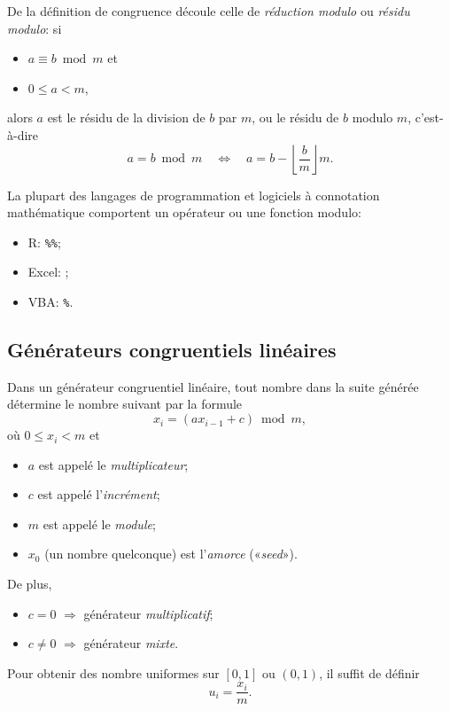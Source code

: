 De la définition de congruence découle celle de \emph{réduction
  modulo} ou \emph{résidu modulo}: si
\begin{itemize}
\item $a \equiv b \bmod m$ et
\item $0 \leq a < m$,
\end{itemize}
alors $a$ est le résidu de la division de $b$ par $m$, ou le résidu de
$b$ modulo $m$, c'est-à-dire
\begin{displaymath}
  a = b \bmod m \quad\Leftrightarrow\quad a = b - \left\lfloor
    \frac{b}{m} \right\rfloor m.
\end{displaymath}

La plupart des langages de programmation et logiciels à connotation
mathématique comportent un opérateur ou une fonction modulo:
\begin{itemize}
\item R: \verb|%%|;
\item Excel: ;
\item VBA: \verb|%|.
\end{itemize}


\subsection{Générateurs congruentiels linéaires}

Dans un générateur congruentiel linéaire, tout nombre dans la suite
générée détermine le nombre suivant par la formule
\begin{displaymath}
  x_i = (a x_{i - 1} + c) \bmod m,
\end{displaymath}
où $0 \leq x_i < m$ et
\begin{itemize}
\item $a$ est appelé le \emph{multiplicateur};
\item $c$ est appelé l'\emph{incrément};
\item $m$ est appelé le \emph{module};
\item $x_0$ (un nombre quelconque) est l'\emph{amorce} («\emph{seed}»).
\end{itemize}
De plus,
\begin{itemize}
\item $c = 0$ $\Rightarrow$ générateur \emph{multiplicatif};
\item $c \neq 0$ $\Rightarrow$ générateur \emph{mixte}.
\end{itemize}

Pour obtenir des nombre uniformes sur $[0, 1]$ ou $(0, 1)$, il suffit
de définir
\begin{displaymath}
  u_i = \frac{x_i}{m}.
\end{displaymath}

